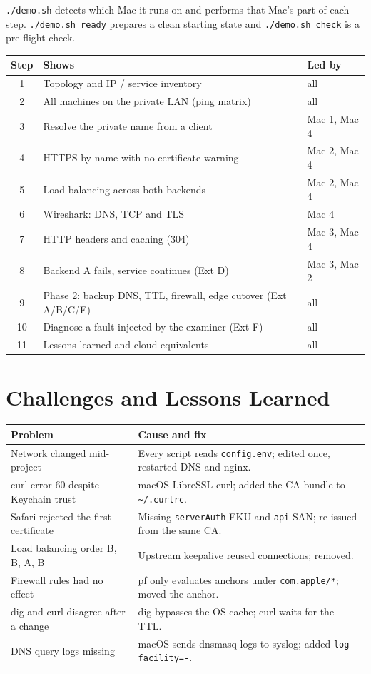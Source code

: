 \documentclass[11pt,a4paper]{article}
\newcommand{\cmd}[1]{\texttt{#1}}
\begin{document}
\cmd{./demo.sh} detects which Mac it runs on and performs that Mac's part of
each step. \cmd{./demo.sh ready} prepares a clean starting state and
\cmd{./demo.sh check} is a pre-flight check.

\begin{table}[h]
\centering
\begin{tabularx}{\textwidth}{c X l}
\toprule
\textbf{Step} & \textbf{Shows} & \textbf{Led by} \\
\midrule
1 & Topology and IP / service inventory & all \\
2 & All machines on the private LAN (ping matrix) & all \\
3 & Resolve the private name from a client & Mac 1, Mac 4 \\
4 & HTTPS by name with no certificate warning & Mac 2, Mac 4 \\
5 & Load balancing across both backends & Mac 2, Mac 4 \\
6 & Wireshark: DNS, TCP and TLS & Mac 4 \\
7 & HTTP headers and caching (304) & Mac 3, Mac 4 \\
8 & Backend A fails, service continues (Ext D) & Mac 3, Mac 2 \\
9 & Phase 2: backup DNS, TTL, firewall, edge cutover (Ext A/B/C/E) & all \\
10 & Diagnose a fault injected by the examiner (Ext F) & all \\
11 & Lessons learned and cloud equivalents & all \\
\bottomrule
\end{tabularx}
\end{table}

\section{Challenges and Lessons Learned}

\begin{tabularx}{\textwidth}{>{\raggedright}p{4.6cm} X}
\toprule
\textbf{Problem} & \textbf{Cause and fix} \\
\midrule
Network changed mid-project & Every script reads \cmd{config.env}; edited once, restarted DNS and nginx. \\
curl error 60 despite Keychain trust & macOS LibreSSL curl; added the CA bundle to \cmd{\textasciitilde/.curlrc}. \\
Safari rejected the first certificate & Missing \cmd{serverAuth} EKU and \cmd{api} SAN; re-issued from the same CA. \\
Load balancing order B, B, A, B & Upstream keepalive reused connections; removed. \\
Firewall rules had no effect & pf only evaluates anchors under \cmd{com.apple/*}; moved the anchor. \\
dig and curl disagree after a change & dig bypasses the OS cache; curl waits for the TTL. \\
DNS query logs missing & macOS sends dnsmasq logs to syslog; added \cmd{log-facility=-}. \\
\bottomrule
\end{tabularx}
\end{document}

